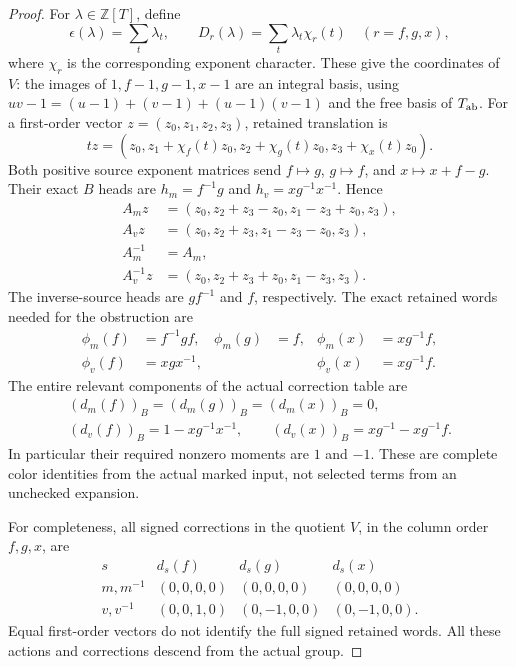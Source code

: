 \begin{proof}
For $\lambda\in\mathbb Z[T]$, define
\[
 \epsilon(\lambda)=\sum_t\lambda_t,
 \qquad D_r(\lambda)=\sum_t\lambda_t\chi_r(t)
 \quad(r=f,g,x),
\]
where $\chi_r$ is the corresponding exponent character. These give
the coordinates of $V$: the images of
$1,f-1,g-1,x-1$ are an integral basis, using
$uv-1=(u-1)+(v-1)+(u-1)(v-1)$ and the free basis of $T_{\rm ab}$.
For a first-order vector $z=(z_0,z_1,z_2,z_3)$, retained translation is
\begin{equation}\label{eq:B142-retained-jet}
 t z=(z_0,z_1+\chi_f(t)z_0,
              z_2+\chi_g(t)z_0,z_3+\chi_x(t)z_0).
\end{equation}
Both positive source exponent matrices send
$f\mapsto g$, $g\mapsto f$, and $x\mapsto x+f-g$.
Their exact $B$ heads are $h_m=f^{-1}g$ and
$h_v=xg^{-1}x^{-1}$. Hence
\begin{equation}\label{eq:B142-source-jets}
 \begin{aligned}
 A_m z&=(z_0,z_2+z_3-z_0,z_1-z_3+z_0,z_3),\\
 A_v z&=(z_0,z_2+z_3,z_1-z_3-z_0,z_3),\\
 A_m^{-1}&=A_m,\\
 A_v^{-1}z&=(z_0,z_2+z_3+z_0,z_1-z_3,z_3).
 \end{aligned}
\end{equation}
The inverse-source heads are $gf^{-1}$ and $f$, respectively.
The exact retained words needed for the obstruction are
\begin{equation}\label{eq:B142-retained-words}
 \begin{aligned}
 \phi_m(f)&=f^{-1}gf,& \phi_m(g)&=f,& \phi_m(x)&=xg^{-1}f,\\
 \phi_v(f)&=xgx^{-1},&&& \phi_v(x)&=xg^{-1}f.
 \end{aligned}
\end{equation}
The entire relevant components of the actual correction table are
\begin{equation}\label{eq:B142-defects}
 \begin{gathered}
 (d_m(f))_B=(d_m(g))_B=(d_m(x))_B=0,\\
 (d_v(f))_B=1-xg^{-1}x^{-1},\qquad
 (d_v(x))_B=xg^{-1}-xg^{-1}f.
 \end{gathered}
\end{equation}
In particular their required nonzero moments are $1$ and $-1$.
These are complete color identities from the actual marked input,
not selected terms from an unchecked expansion.

For completeness, all signed corrections in the quotient $V$, in
the column order $f,g,x$, are
\[
 \begin{array}{c|ccc}
 s&d_s(f)&d_s(g)&d_s(x)\\ \hline
 m,m^{-1}&(0,0,0,0)&(0,0,0,0)&(0,0,0,0)\\
 v,v^{-1}&(0,0,1,0)&(0,-1,0,0)&(0,-1,0,0).
 \end{array}
\]
Equal first-order vectors do not identify the full signed retained words.
All these actions and corrections descend from the actual group.


\end{proof}
